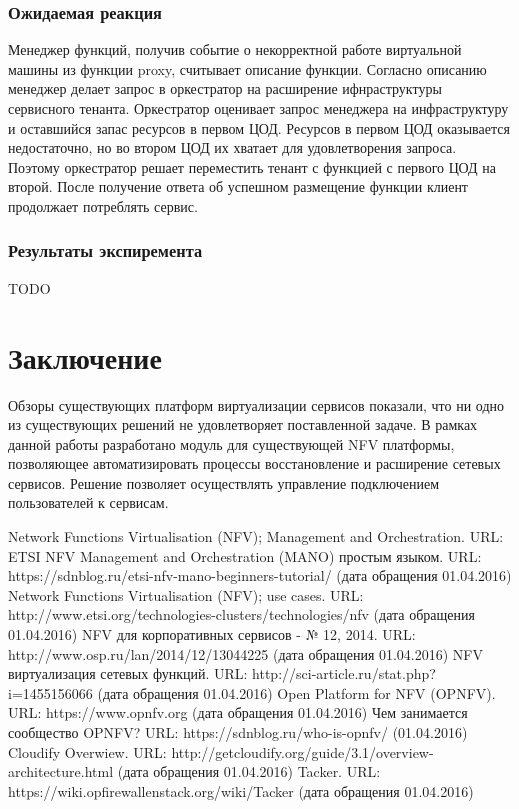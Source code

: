 \documentclass[oneside,final,14pt,a4paper]{extreport}
\begin{document}
\subsection{Ожидаемая реакция}
Менеджер функций, получив событие о некорректной работе виртуальной машины из функции proxy, считывает описание функции. Согласно описанию менеджер делает запрос в оркестратор на расширение ифнраструктуры сервисного тенанта. Оркестратор оценивает запрос менеджера на инфраструктуру и оставшийся запас ресурсов в первом ЦОД. Ресурсов в первом ЦОД оказывается недостаточно, но во втором ЦОД их хватает для удовлетворения запроса. Поэтому оркестратор решает переместить тенант с функцией с первого ЦОД на второй. После получение ответа об успешном размещение функции клиент продолжает потреблять сервис.

\subsection{Результаты экспиремента}
TODO





\chapter*{Заключение}
Обзоры существующих платформ виртуализации сервисов показали, что ни одно из существующих решений не удовлетворяет поставленной задаче. В рамках данной работы разработано модуль для существующей NFV платформы, позволяющее автоматизировать процессы восстановление и расширение сетевых сервисов. Решение позволяет осуществлять управление подключением пользователей к сервисам. 





\begin{thebibliography}{00}
 Network Functions Virtualisation (NFV); Management and Orchestration. URL: %
 ETSI NFV Management and Orchestration (MANO) простым языком. URL: https://sdnblog.ru/etsi-nfv-mano-beginners-tutorial/ (дата обращения 01.04.2016)
 Network Functions Virtualisation (NFV); use cases. URL: http://www.etsi.org/technologies-clusters/technologies/nfv (дата обращения 01.04.2016)
 NFV для корпоративных сервисов - № 12, 2014. URL: http://www.osp.ru/lan/2014/12/13044225 (дата обращения 01.04.2016)
 NFV виртуализация сетевых функций. URL: http://sci-article.ru/stat.php?i=1455156066 (дата обращения 01.04.2016)
 Open Platform for NFV (OPNFV). URL: https://www.opnfv.org (дата обращения 01.04.2016)
 Чем занимается сообщество OPNFV? URL:  https://sdnblog.ru/who-is-opnfv/ (01.04.2016)
 Cloudify Overwiew. URL: http://getcloudify.org/guide/3.1/overview-architecture.html (дата обращения 01.04.2016)
 Tacker. URL: https://wiki.opfirewallenstack.org/wiki/Tacker (дата обращения 01.04.2016)
\end{thebibliography}

\end{document}
